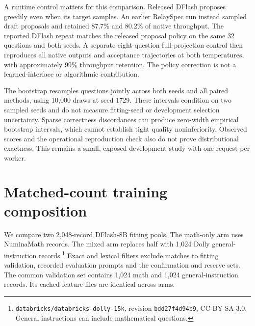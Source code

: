 \documentclass{article}
\begin{document}
A runtime control matters for this comparison. Released DFlash proposes
greedily even when its target samples. An earlier RelaySpec run instead
sampled draft proposals and retained 87.7\% and 80.2\% of native throughput.
The reported DFlash repeat matches the released proposal policy on the
same 32 questions and both seeds. A separate eight-question full-projection
control then reproduces all native outputs and acceptance trajectories
at both temperatures, with approximately 99\% throughput retention.
The policy correction is not a learned-interface or algorithmic contribution.

The bootstrap resamples questions jointly across both seeds and all
paired methods, using 10,000 draws at seed 1729. These intervals condition
on two sampled seeds and do not measure fitting-seed or development
selection uncertainty. Sparse correctness discordances can produce
zero-width empirical bootstrap intervals, which cannot establish tight
quality noninferiority. Observed scores and the operational reproduction
check also do not prove distributional exactness. This remains a small,
exposed development study with one request per worker.

\begin{table}[H]
\centering\small

\caption{Sampled GSM8K decoding, 32 fixed questions and two sampling seeds.
Each row has 64 scored outputs. Time ratio is summed AR request time
relative to method time, while Tokens is mean output length. Native is
target-specific and RelaySpec retargets the released 4B drafter. Paired
95\% intervals cluster both seeds by question. All methods avoid the cap.}
\label{tab:sampling-breadth}
\end{table}

\section{Matched-count training composition}
\label{app:composition}
We compare two 2,048-record DFlash-8B fitting pools. The math-only arm
uses NuminaMath records. The mixed arm replaces half with 1,024
Dolly general-instruction records.\footnote{\texttt{databricks/databricks-dolly-15k},
revision \texttt{bdd27f4d94b9}, CC-BY-SA 3.0. General instructions can
include mathematical questions.} Exact and lexical filters exclude
matches to fitting validation, recorded evaluation prompts and the
confirmation and reserve sets. The common validation set contains
1,024 math and 1,024 general-instruction records. Its cached feature
files are identical across arms.
\end{document}
